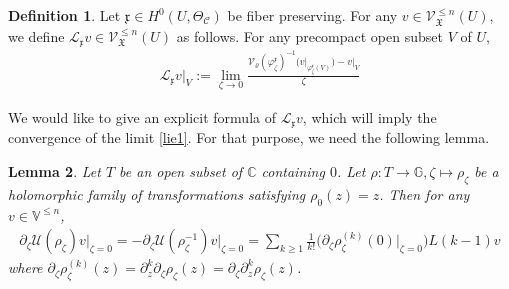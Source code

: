 \documentclass[11pt,b5paper,notitlepage]{article}
\theoremstyle{definition}
\newtheorem{df}{Definition}[section]
\newtheorem{rem}[df]{Remark}
\theoremstyle{plain}
\newtheorem{lm}[df]{Lemma}
\newcommand{\mc}{\mathcal}
\newcommand{\ML}{\mathcal{L}}
\newcommand{\SV}{\mathscr{V}}
\newcommand{\xk}{\mathfrak x}
\newcommand{\yk}{\mathfrak y}
\newcommand{\blt}{\bullet}
\newcommand{\Vbb}{\mathbb V}
\newcommand{\Gbb}{\mathbb G}
\newcommand{\Cbb}{\mathbb C}
\newcommand{\<}{\left\langle}
\renewcommand{\>}{\right\rangle}
\newcommand{\MU}{\mathcal{U}}
\newcommand{\MC}{\mathcal{C}}
\newcommand{\MB}{\mathcal{B}}
\newcommand{\fx}{\mathfrak{X}}
\newcommand{\MV}{\mathcal{V}}
\numberwithin{equation}{section}
\begin{document}
\begin{df}\label{lbb2}
Let $\xk\in H^0(U,\Theta_\MC)$ be fiber preserving.  For any $v\in \SV_\fx^{\leq n}(U)$, we define $\ML_\xk v\in \SV_\fx^{\leq n}(U)$ as follows. For any precompact open subset $V$ of $U$,
    \begin{align}\label{lie1}
        \ML_\xk v\vert_V:=\lim_{\zeta\rightarrow 0} \frac{\MV_\varrho(\varphi_\zeta^\xk)^{-1}\big(v\vert_{\varphi_\zeta^\xk(V)}\big)-v\vert_V}{\zeta}
    \end{align}
\end{df}


\begin{comment}
\begin{rem}\label{rem1}
\eqref{shortexact} implies a long exact sequence of cohomology group
\begin{align*}
    0\rightarrow H^0\big(U,\Theta_{\MC/\MB}(\blt S_\fx)\big)\rightarrow H^0\big(U,\Theta_\MC(\blt S_\fx)\big)
    \xrightarrow{d\pi}H^0\big(U,\pi^* \Theta_\MB(\blt S_\fx)\big)\rightarrow \cdots.
\end{align*}
We can find $\yk\in H^0\big(\pi(U),\Theta_\MB(\blt S_\fx)\big)$ such that $d\pi (\xk)=\pi^* \yk$. This means $\xk$ is a vector field on $U$ whose projection onto $\MB$ depends only on the points of $\MB$.
\end{rem}
\end{comment}

We would like to give an explicit formula of $\ML_\xk v$, which will imply the convergence of the limit \eqref{lie1}. For that purpose, we need the following lemma.
\begin{lm}\label{lemma1}
Let $T$ be an open subset of $\Cbb$ containing $0$. Let $\rho:T\rightarrow\Gbb,\zeta\mapsto\rho_\zeta$ be a holomorphic family of transformations satisfying $\rho_0(z)=z$. Then for any $v\in\Vbb^{\leq n}$,
\begin{align}\label{eqb19}
    \partial_\zeta \MU(\rho_\zeta)v\big\vert_{\zeta=0}=-\partial_\zeta \MU(\rho_\zeta^{-1})v\big\vert_{\zeta=0}=\sum_{k\geq 1}\frac{1}{k!}\big(\partial_\zeta\rho_\zeta^{(k)}(0)\big|_{\zeta=0}\big)L(k-1)v
\end{align}
where $\partial_\zeta\rho_\zeta^{(k)}(z)=\partial_z^k\partial_\zeta\rho_\zeta(z)=\partial_\zeta\partial_z^k\rho_\zeta(z)$.
\end{lm}

\end{document}

